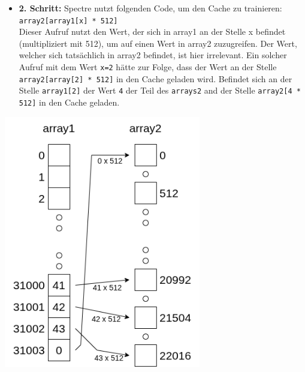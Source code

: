 \noindent
\begin{minipage}{0.58\textwidth}
    \begin{itemize}
        \item \textbf{2. Schritt:} Spectre nutzt folgenden Code, um den Cache zu trainieren: \\
        \texttt{array2[array1[x] * 512]} \\
        Dieser Aufruf nutzt den Wert, der sich in array1 an der Stelle x befindet (multipliziert mit 512), um auf einen Wert in array2 zuzugreifen.
        Der Wert, welcher sich tatsächlich in array2 befindet, ist hier irrelevant.
        Ein solcher Aufruf mit dem Wert \texttt{x=2} hätte zur Folge, dass der Wert an der Stelle \texttt{array2[array[2] * 512]} in den Cache geladen wird.
        Befindet sich an der Stelle \texttt{array1[2]} der Wert \texttt{4} der Teil des \texttt{arrays2} and der Stelle \texttt{array2[4 * 512]} in den Cache geladen.
    \end{itemize}
\end{minipage}%
\hfill%
\begin{minipage}{0.4\textwidth}
    \centering
    \includegraphics[width=\linewidth]{Attack-2} %
\end{minipage}


